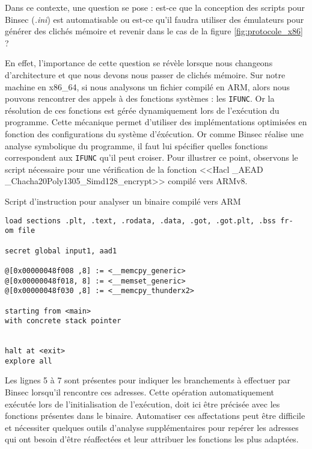 Dans ce contexte, une question se pose : est-ce que la conception des scripts pour Binsec (\textit{.ini}) est automatisable ou est-ce qu'il faudra utiliser des émulateurs pour générer des clichés mémoire et revenir dans le cas de la figure \ref{fig:protocole_x86} ?\smallbreak

En effet, l'importance de cette question se révèle lorsque nous changeons d'architecture et que nous devons nous passer de clichés mémoire. Sur notre machine en x86\_64, si nous analysons un fichier compilé en ARM, alors nous pouvons rencontrer des appels à des fonctions systèmes : les \texttt{IFUNC}. Or la résolution de ces fonctions est gérée dynamiquement lors de l'exécution du programme. Cette mécanique permet d'utiliser des implémentations optimisées en fonction des configurations du système d'éxécution. Or comme Binsec réalise une analyse symbolique du programme, il faut lui spécifier quelles fonctions correspondent aux \texttt{IFUNC} qu'il peut croiser. Pour illustrer ce point, observons le script nécessaire pour une vérification de la fonction <<Hacl \_AEAD \_Chacha20Poly1305\_Simd128\_encrypt>> compilé vers ARMv8.

\begin{listing}[!ht]
    \caption{Script d'instruction pour analyser un binaire compilé vers ARM}
    \label{lst:script_arm_exemple}
    \begin{verbatim}
load sections .plt, .text, .rodata, .data, .got, .got.plt, .bss fr-
om file

secret global input1, aad1

@[0x00000048f008 ,8] := <__memcpy_generic>
@[0x00000048f018, 8] := <__memset_generic>
@[0x00000048f030 ,8] := <__memcpy_thunderx2>

starting from <main>
with concrete stack pointer


halt at <exit>
explore all 
    \end{verbatim}
\end{listing}

Les lignes 5 à 7 sont présentes pour indiquer les branchements à effectuer par Binsec lorsqu'il rencontre ces adresses. Cette opération automatiquement exécutée lors de l'initialisation de l'exécution, doit ici être précisée avec les fonctions présentes dans le binaire. Automatiser ces affectations peut être difficile et nécessiter quelques outils d'analyse supplémentaires pour repérer les adresses qui ont besoin d'être réaffectées et leur attribuer les fonctions les plus adaptées.\medbreak


